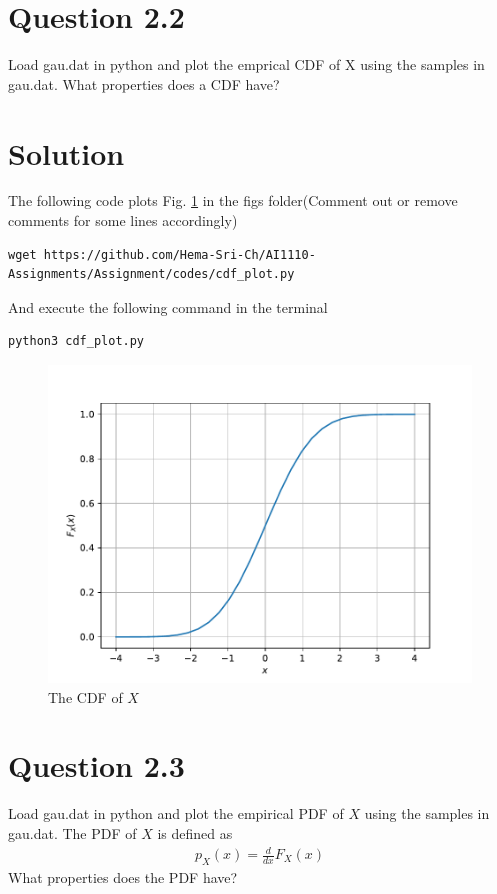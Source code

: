 \documentclass[16pt, a4paper, two column]{article}
\begin{document}
\section*{Question 2.2}
Load gau.dat in python and plot the emprical CDF of X using the samples in gau.dat. What properties does a CDF have?
\section*{Solution}
The following code plots Fig. \ref{fig:gauss_cdf} in the figs folder(Comment out or remove comments for some lines accordingly)
\begin{lstlisting}
wget https://github.com/Hema-Sri-Ch/AI1110-Assignments/Assignment/codes/cdf_plot.py
\end{lstlisting}
And execute the following command in the terminal 
\begin{lstlisting}
python3 cdf_plot.py
\end{lstlisting}
\begin{figure}[h]
	\centering
	\includegraphics[width=\columnwidth]{gauss_cdf}
	\caption{The CDF of $X$}
	\label{fig:gauss_cdf}
\end{figure}

\section*{Question 2.3}
Load gau.dat in python and plot the empirical PDF of $X$ using the samples in gau.dat. The PDF of $X$ is defined as
\begin{align}
p_{X}(x) = \frac{d}{dx}F_{X}(x)
\end{align}
What properties does the PDF have?
\end{document}
